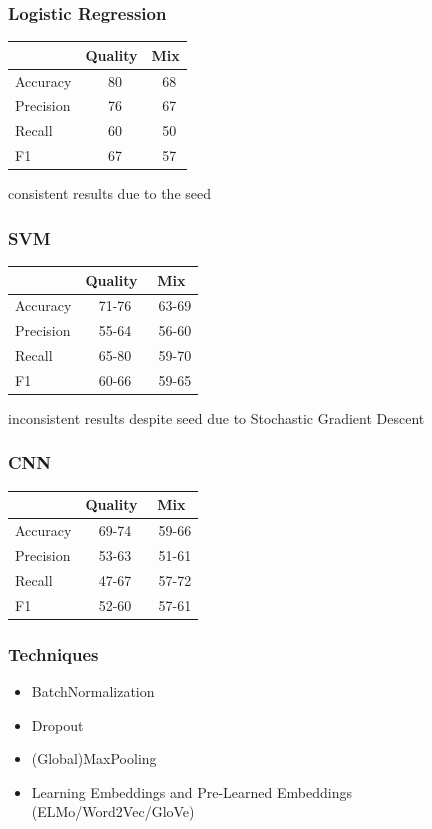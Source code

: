 \documentclass{beamer}
\begin{document}
\begin{frame}
    \frametitle{Logistic Regression}
    \begin{tabular}{l|c|c}
                  & Quality & Mix \\\hline
        Accuracy  & ~80 & ~68 \\
        Precision & ~76 & ~67 \\
        Recall    & ~60 & ~50 \\
        F1        & ~67 & ~57
    \end{tabular}
    consistent results due to the seed
\end{frame}

\begin{frame}
    \frametitle{SVM}
    \begin{tabular}{l|c|c}
                  & Quality & Mix \\\hline
        Accuracy  & ~71-76 & ~63-69\\
        Precision & ~55-64 & ~56-60\\
        Recall    & ~65-80 & ~59-70\\
        F1        & ~60-66 & ~59-65
    \end{tabular}
    inconsistent results despite seed due to Stochastic Gradient Descent
\end{frame}

\begin{frame}
    \frametitle{CNN}
    \begin{tabular}{l|c|c}
                  & Quality & Mix \\\hline
        Accuracy  & ~69-74 & ~59-66 \\
        Precision & ~53-63 & ~51-61 \\
        Recall    & ~47-67 & ~57-72 \\
        F1        & ~52-60 & ~57-61
    \end{tabular}
\end{frame}

\begin{frame}
    \frametitle{Techniques}
    \begin{itemize}
        \item BatchNormalization
        \item Dropout
        \item (Global)MaxPooling
        \item Learning Embeddings and Pre-Learned Embeddings (ELMo/Word2Vec/GloVe)
    \end{itemize}
\end{frame}
\end{document}
